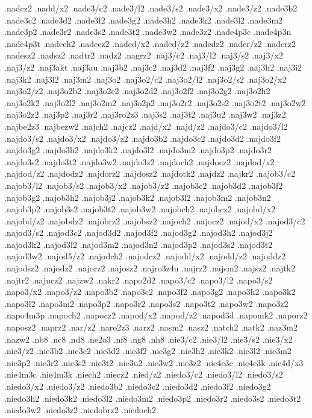 {.nadcz2
.nadd/x2
.nade3/c2
.nade3/l2
.nade3/s2
.nade3/x2
.nade3/z2
.nade3b2
.nade3c2
.nade3d2
.nade3f2
.nade3g2
.nade3h2
.nade3k2
.nade3l2
.nade3m2
.nade3p2
.nade3r2
.nade3s2
.nade3t2
.nade3w2
.nade3z2
.nade4p3c
.nade4p3n
.nade4p3t
.nadech2
.nadecz2
.naded/x2
.naded/z2
.nadedz2
.nader/z2
.naderz2
.nadesz2
.nadsz2
.nadtr2
.nadz2
.nagrz2
.naj3/c2
.naj3/l2
.naj3/s2
.naj3/x2
.naj3/z2
.naj3akt
.naj3au
.naj3b2
.naj3c2
.naj3d2
.naj3f2
.naj3g2
.naj3h2
.naj3i2
.naj3k2
.naj3l2
.naj3m2
.naj3o2
.naj3o2/c2
.naj3o2/l2
.naj3o2/s2
.naj3o2/x2
.naj3o2/z2
.naj3o2b2
.naj3o2c2
.naj3o2d2
.naj3o2f2
.naj3o2g2
.naj3o2h2
.naj3o2k2
.naj3o2l2
.naj3o2m2
.naj3o2p2
.naj3o2r2
.naj3o2s2
.naj3o2t2
.naj3o2w2
.naj3o2z2
.naj3p2
.naj3r2
.naj3ro2z3
.naj3s2
.naj3t2
.naj3u2
.naj3w2
.naj3z2
.najbe2z3
.najbezw2
.najch2
.najcz2
.najd/x2
.najd/z2
.najdo3/c2
.najdo3/l2
.najdo3/s2
.najdo3/x2
.najdo3/z2
.najdo3b2
.najdo3c2
.najdo3d2
.najdo3f2
.najdo3g2
.najdo3h2
.najdo3k2
.najdo3l2
.najdo3m2
.najdo3p2
.najdo3r2
.najdo3s2
.najdo3t2
.najdo3w2
.najdo3z2
.najdoch2
.najdocz2
.najdod/x2
.najdod/z2
.najdodz2
.najdorz2
.najdosz2
.najdotk2
.najdz2
.najkr2
.najob3/c2
.najob3/l2
.najob3/s2
.najob3/x2
.najob3/z2
.najob3c2
.najob3d2
.najob3f2
.najob3g2
.najob3h2
.najob3j2
.najob3k2
.najob3l2
.najob3m2
.najob3n2
.najob3p2
.najob3s2
.najob3t2
.najob3w2
.najobch2
.najobcz2
.najobd/x2
.najobd/z2
.najobdz2
.najobrz2
.najobsz2
.najoch2
.najocz2
.najod/x2
.najod3/c2
.najod3/s2
.najod3c2
.najod3d2
.najod3f2
.najod3g2
.najod3h2
.najod3j2
.najod3k2
.najod3l2
.najod3m2
.najod3n2
.najod3p2
.najod3s2
.najod3t2
.najod3w2
.najod5/z2
.najodch2
.najodcz2
.najodd/x2
.najodd/z2
.najoddz2
.najodsz2
.najodz2
.najorz2
.najosz2
.najro3z4u
.najrz2
.najsm2
.najsz2
.najtk2
.najtr2
.najucz2
.najzw2
.nakr2
.napo2d2
.napo3/c2
.napo3/l2
.napo3/s2
.napo3/x2
.napo3/z2
.napo3b2
.napo3c2
.napo3f2
.napo3g2
.napo3h2
.napo3k2
.napo3l2
.napo3m2
.napo3p2
.napo3r2
.napo3s2
.napo3t2
.napo3w2
.napo3z2
.napo4m3p
.napoch2
.napocz2
.napod/x2
.napod/z2
.napod3d
.napomk2
.naporz2
.naposz2
.naprz2
.nar/z2
.naro2z3
.narz2
.nasm2
.nasz2
.natch2
.natk2
.naz3m2
.nazw2
.nb8
.nc8
.nd8
.ne2o3
.nf8
.ng8
.nh8
.nie3/c2
.nie3/l2
.nie3/s2
.nie3/x2
.nie3/z2
.nie3b2
.nie3c2
.nie3d2
.nie3f2
.nie3g2
.nie3h2
.nie3k2
.nie3l2
.nie3m2
.nie3p2
.nie3r2
.nie3s2
.nie3t2
.nie3u2
.nie3w2
.nie3z2
.nie4c3c
.nie4c3k
.nie4d/x3
.nie4m3c
.nie4m3k
.niech2
.niecz2
.nied/z2
.niedo3/c2
.niedo3/l2
.niedo3/s2
.niedo3/x2
.niedo3/z2
.niedo3b2
.niedo3c2
.niedo3d2
.niedo3f2
.niedo3g2
.niedo3h2
.niedo3k2
.niedo3l2
.niedo3m2
.niedo3p2
.niedo3r2
.niedo3s2
.niedo3t2
.niedo3w2
.niedo3z2
.niedobrz2
.niedoch2
}
